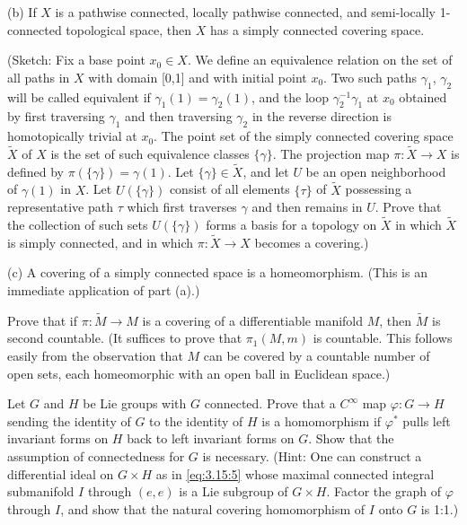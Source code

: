 \begin{problemset}
(b) If $X$ is a pathwise connected, locally pathwise connected, and semi-locally 1-connected topological space, then $X$ has a simply connected covering space.

(Sketch: Fix a base point $x_0 \in X$. We define an equivalence relation on the set of all paths in $X$ with domain [0,1] and with initial point $x_0$. Two such paths $\gamma_1$, $\gamma_2$ will be called equivalent if $\gamma_1(1) = \gamma_2(1)$, and the loop $\gamma_2^{-1}\gamma_1$ at $x_0$ obtained by first traversing $\gamma_1$ and then traversing $\gamma_2$ in the reverse direction is homotopically trivial at $x_0$. The point set of the simply connected covering space $\tilde{X}$ of $X$ is the set of such equivalence classes $\{\gamma\}$. The projection map $\pi: \tilde{X} \to X$ is defined by $\pi(\{\gamma\}) = \gamma(1)$. Let $\{\gamma\} \in \tilde{X}$, and let $U$ be an open neighborhood of $\gamma(1)$ in $X$. Let $U(\{\gamma\})$ consist of all elements $\{\tau\}$ of $\tilde{X}$ possessing a representative path $\tau$ which first traverses $\gamma$ and then remains in $U$. Prove that the collection of such sets $U(\{\gamma\})$ forms a basis for a topology on $\tilde{X}$ in which $\tilde{X}$ is simply connected, and in which $\pi: \tilde{X} \to X$ becomes a covering.)

(c) A covering of a simply connected space is a homeomorphism. (This is an immediate application of part (a).)

\item Prove that if $\pi: \tilde{M} \to M$ is a covering of a differentiable manifold $M$, then $\tilde{M}$ is second countable. (It suffices to prove that $\pi_{1}(M, m)$ is countable. This follows easily from the observation that $M$ can be covered by a countable number of open sets, each homeomorphic with an open ball in Euclidean space.)

\item Let $G$ and $H$ be Lie groups with $G$ connected. Prove that a $C^{\infty}$ map $\varphi: G \to H$ sending the identity of $G$ to the identity of $H$ is a homomorphism if $\varphi^{*}$ pulls left invariant forms on $H$ back to left invariant forms on $G$. Show that the assumption of connectedness for $G$ is necessary. (Hint: One can construct a differential ideal on $G \times H$ as in \eqref{eq:3.15:5} whose maximal connected integral submanifold $I$ through $(e,e)$ is a Lie subgroup of $G \times H$. Factor the graph of $\varphi$ through $I$, and show that the natural covering homomorphism of $I$ onto $G$ is 1:1.)


\end{problemset}
